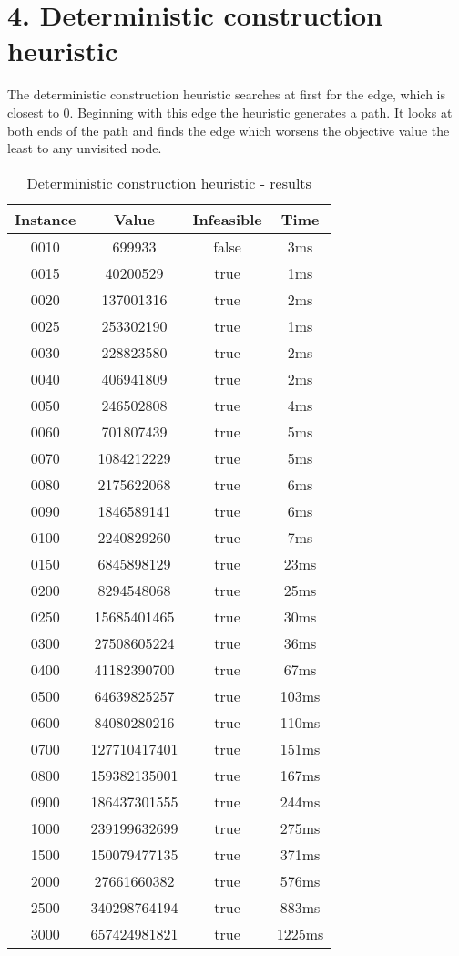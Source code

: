 \section*{4. Deterministic construction heuristic}
The deterministic construction heuristic searches at first for the edge, which is closest to 0. Beginning with this edge the heuristic generates a path. It looks at both ends of the path and finds the edge which worsens the objective value the least to any unvisited node.

\begin{table}
\centering
	\begin{tabular}{||c | c | c | c||} 
		\hline
		Instance  & Value & Infeasible & Time \\
		\hline\hline
0010 & 699933 & false & 3ms \\
0015 & 40200529 & true & 1ms \\
0020 & 137001316 & true & 2ms \\
0025 & 253302190 & true & 1ms \\
0030 & 228823580 & true & 2ms \\
0040 & 406941809 & true & 2ms \\
0050 & 246502808 & true & 4ms \\
0060 & 701807439 & true & 5ms \\
0070 & 1084212229 & true & 5ms \\
0080 & 2175622068 & true & 6ms \\
0090 & 1846589141 & true & 6ms \\
0100 & 2240829260 & true & 7ms \\
0150 & 6845898129 & true & 23ms \\
0200 & 8294548068 & true & 25ms \\
0250 & 15685401465 & true & 30ms \\
0300 & 27508605224 & true & 36ms \\
0400 & 41182390700 & true & 67ms \\
0500 & 64639825257 & true & 103ms \\
0600 & 84080280216 & true & 110ms \\
0700 & 127710417401 & true & 151ms \\
0800 & 159382135001 & true & 167ms \\
0900 & 186437301555 & true & 244ms \\
1000 & 239199632699 & true & 275ms \\
1500 & 150079477135 & true & 371ms \\
2000 & 27661660382 & true & 576ms \\
2500 & 340298764194 & true & 883ms \\
3000 & 657424981821 & true & 1225ms \\
		\hline
	\end{tabular}
\caption{Deterministic construction heuristic - results}
\end{table}